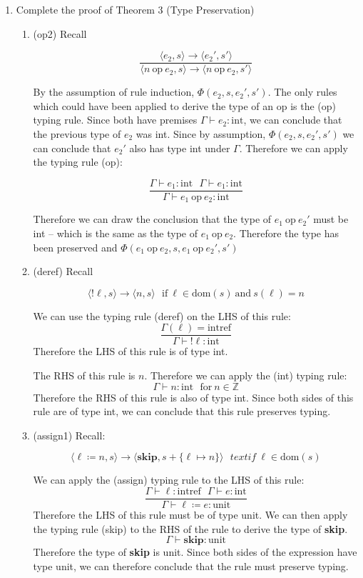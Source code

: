 \documentclass[10pt,\jkfside,a4paper]{article}
\begin{document}
\begin{enumerate}
\item Complete the proof of Theorem 3 (Type Preservation)

\begin{enumerate}[label=\textbf{Case}]

\item (op2) Recall

\[
\dfrac{\langle e_2, s \rangle \to \langle e_2', s' \rangle }
{\langle n \ \text{op} \ e_2, s \rangle \to \langle n \ \text{op} \
e_2, s' \rangle }
\]

By the assumption of rule induction, $\Phi(e_2, s, e_2', s')$. The only
rules which could have been applied to derive the type of an op is the (op)
typing rule. Since both have premises $\Gamma \vdash
e_2:\text{int}$, we can conclude that the previous type of $e_2$ was int.
Since by assumption, $\Phi(e_2, s, e_2', s')$ we can conclude that $e_2'$
also has type int under $\Gamma$. Therefore we can apply the typing rule (op):

\[
\dfrac{\Gamma \vdash e_1: \text{int} \ \ \ \Gamma \vdash e_1:
\text{int}}{\Gamma \vdash e_1 \ \text{op} \ e_2: \text{int}}
\]

Therefore we can draw the conclusion that the type of $e_1 \ \text{op} \
e_2'$ must be int -- which is the same as the type of $e_1 \ \text{op} \
e_2$. Therefore the type has been preserved and $\Phi(e_1 \ \text{op} \
e_2, s, e_1 \ \text{op} \
e_2', s')$

\item (deref) Recall

\[
\langle !\ell, s \rangle \to \langle n, s \rangle \ \ \ \text{if} \ \ell \in
\text{dom}(s) \ \text{and} \ s(\ell) = n
\]

We can use the typing rule (deref) on the LHS of this rule:
\[
\dfrac{\Gamma(\ell) = \text{intref}}{\Gamma\vdash !\ell: \text{int}}
\]
Therefore the LHS of this rule is of type int.

The RHS of this rule is $n$. Therefore we can apply the (int) typing rule:
\[
\Gamma \vdash n: \text{int} \ \ \ \text{for} \ n \in \mathbb{Z}
\]
Therefore the RHS of this rule is also of type int. Since both sides of this
rule are of type int, we can conclude that this rule preserves typing.

\item (assign1) Recall:

\[
\langle \ell \coloneqq n, s \rangle \to \langle \textbf{skip}, s + \{\ell
\mapsto n\} \rangle \ \ \ text{if} \ \ell \in \text{dom}(s)
\]

We can apply the (assign) typing rule to the LHS of this rule:
\[
\dfrac{\Gamma \vdash \ell: \text{intref} \  \ \ \Gamma \vdash e:
\text{int}}{\Gamma \vdash \ell \coloneqq e: \text{unit}}
\]
Therefore the LHS of this rule must be of type unit. We can then apply
the typing rule (skip) to the RHS of the rule to derive the type of
\textbf{skip}.
\[
\Gamma \vdash \textbf{skip}: \text{unit}
\]
Therefore the type of \textbf{skip} is unit. Since both sides of the
expression have type unit, we can therefore conclude that the rule must
preserve typing.


\end{enumerate}
\end{enumerate}
\end{document}
